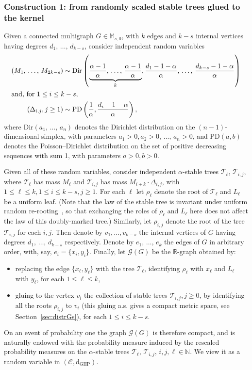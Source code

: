 \documentclass[AHL,Unicode,longabstracts,published]{cedram}
\newcommand{\PD}{\mathrm{PD}}
\newcommand{\GHP}{\mathrm{GHP}}
\newcommand{\rmd}{\mathrm{d}}
\newcommand{\Dir}{\mathrm{Dir}}
\newcommand{\cG}{\mathcal{G}}
\newcommand{\cT}{\mathcal{T}}
\newcommand{\scrC}{\mathscr{C}}
\newcommand{\R}{\mathbb{R}}
\newcommand{\M}{\mathbb{M}}
\newcommand{\N}{\mathbb{N}}
\newcommand{\R}{\mathbb{R}}
\begin{document}
\subsubsection{Construction 1: from randomly scaled stable trees glued to the kernel}\label{cons1:gluing}
Given a connected multigraph $G \in \M_{s,0}$, with $k$ edges and $k-s$ internal vertices having degrees $d_1,\,\ldots,\,d_{k-s}$, consider independent random variables
\begin{align}
\left(M_1,\,\ldots,\,M_{2k-s}\right) &\sim \Dir \left(\underbrace{\frac{\alpha-1}{\alpha},\,\ldots,\,\frac{\alpha-1}{\alpha}}_{k},\frac{d_1-1-\alpha}{\alpha},\,\ldots,\,\frac{d_{k-s}-1-\alpha}{\alpha}\right)\label{distr1}
\\
\intertext{and, for $1 \leq i \leq k-s$,}
\left(\Delta_{i,j}, j \geq 1\right) &\sim \PD\left(\frac{1}{\alpha},\frac{d_i-1-\alpha}{\alpha}\right),\label{distr2}
\end{align}
where $\Dir(a_1,\,\ldots,\,a_n)$ denotes the Dirichlet distribution on the $(n-1)$-dimensional simplex, with parameters $a_1>0,a_2>0,\,\ldots,\,a_n>0$, and $\PD(a,b)$ denotes the Poisson--Dirichlet distribution on the set of positive decreasing sequences with sum 1, with parameters $a>0,b>0$.

Given all of these random variables, consider independent $\alpha$-stable trees $\cT_{\ell}$, $\cT_{i,j}$, where $\cT_{\ell}$ has mass $M_{\ell}$ and $\cT_{i,j}$ has mass $M_{i+k} \cdot \Delta_{i,j}$, with $1 \leq \ell \leq k, 1 \leq i \leq k-s, j \geq 1$. For each $\ell$ let $\rho_\ell$ denote the root of $\cT_{\ell}$ and $L_{\ell}$ be a uniform leaf. (Note that the law of the stable tree is invariant under uniform random re-rooting~\cite{DLG09,HaasPitmanWinkel}, so that exchanging the roles of $\rho_{\ell}$ and $L_{\ell}$ here does not affect the law of this doubly-marked tree.) Similarly, let $\rho_{i,j}$ denote the root of the tree $\cT_{i,j}$ for each $i,j$. Then denote by $v_1,\ldots, v_{k-s}$ the internal vertices of $G$ having degrees $d_1,\,\ldots,\,d_{k-s}$ respectively. Denote by $ e_1,\,\ldots,\,e_{k}$ the edges of $G$ in arbitrary order, with, say, $e_i=\{x_i,y_i\}$. Finally, let $\cG(G)$ be the $\R$-graph obtained by:
\begin{itemize}
\item replacing the edge $\{x_{\ell},y_{\ell}\}$ with the tree $\cT_{\ell}$, identifying $\rho_{\ell}$ with $x_{\ell}$ and $L_{\ell}$ with $y_{\ell}$, for each $1\leq \ell \leq k$,
\item gluing to the vertex $v_i$ the collection of stable trees $\cT_{i,j},j\geq 0$, by identifying all the roots $\rho_{i,j}$ to $v_i$ (this gluing a.s. gives a compact metric space, see Section~\ref{sec:distrGs}), for each $1\leq i \leq k-s$.
\end{itemize}
On an event of probability one the graph $\cG(G)$ is therefore compact, and is naturally endowed with the probability measure induced by the rescaled probability measures on the $\alpha$-stable trees $\cT_{\ell}$, $\cT_{i,j}$, $i,j,\ell \in \N$. We view it as a random variable in $(\scrC,\rmd_{\GHP})$.
\end{document}
